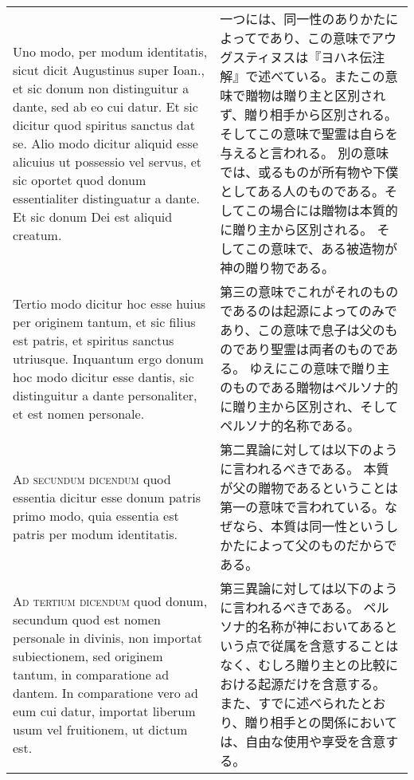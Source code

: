 \documentclass[10pt]{jsarticle} %
\begin{document}
\begin{longtable}{p{21em}p{21em}}
\\


Uno modo, per modum identitatis, sicut dicit Augustinus super
Ioan., et sic donum non distinguitur a dante, sed ab eo cui datur. Et sic
dicitur quod spiritus sanctus dat se. Alio modo dicitur aliquid esse alicuius
ut possessio vel servus, et sic oportet quod donum essentialiter distinguatur a
dante. Et sic donum Dei est aliquid creatum. 



&

一つには、同一性のありかたによってであり、この意味でアウグスティヌスは『ヨハネ伝注解』で述べている。またこの意味で贈物は贈り主と区別されず、贈り相手から区別される。
そしてこの意味で聖霊は自らを与えると言われる。
別の意味では、或るものが所有物や下僕としてある人のものである。そしてこの場合には贈物は本質的に贈り主から区別される。
そしてこの意味で、ある被造物が神の贈り物である。

\\


Tertio modo dicitur hoc esse huius
per originem tantum, et sic filius est patris, et spiritus sanctus utriusque.
Inquantum ergo donum hoc modo dicitur esse dantis, sic distinguitur a dante
personaliter, et est nomen personale.


&

第三の意味でこれがそれのものであるのは起源によってのみであり、この意味で息子は父のものであり聖霊は両者のものである。
ゆえにこの意味で贈り主のものである贈物はペルソナ的に贈り主から区別され、そしてペルソナ的名称である。

\\

\textsc{Ad secundum dicendum} quod essentia dicitur esse donum patris primo modo, quia essentia est patris per modum identitatis.


&

第二異論に対しては以下のように言われるべきである。
本質が父の贈物であるということは第一の意味で言われている。なぜなら、本質は同一性というしかたによって父のものだからである。

\\

\textsc{Ad tertium dicendum} quod donum, secundum quod est nomen personale in divinis, non importat subiectionem, sed originem tantum, in comparatione ad dantem. In comparatione vero ad eum cui datur, importat liberum usum vel fruitionem, ut dictum est.


&

第三異論に対しては以下のように言われるべきである。
ペルソナ的名称が神においてあるという点で従属を含意することはなく、むしろ贈り主との比較における起源だけを含意する。
また、すでに述べられたとおり、贈り相手との関係においては、自由な使用や享受を含意する。


\end{longtable}
\end{document}
